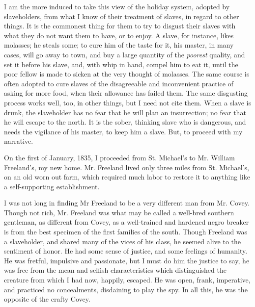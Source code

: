 I am the more induced to take this view of the holiday system, adopted
by slaveholders, from what I know of their treatment of slaves, in
regard to other things. It is the commonest thing for them to try to
disgust their slaves with what they do not want them to have, or to
enjoy. A slave, for instance, likes molasses; he steals some; to cure
him of the taste for it, his master, in many cases, will go away to
town, and buy a large quantity of the \emph{poorest} quality, and set it
before his slave, and, with whip in hand, compel him to eat it, until
the poor fellow is made to sicken at the very thought of molasses. The
same course is often adopted to cure slaves of the disagreeable and
inconvenient practice of asking for more food, when their allowance has
failed them. The same disgusting process works well, too, in other
things, but I need not cite them. When a slave is drunk, the slaveholder
has no fear that he will plan an insurrection; no fear that he will
escape to the north. It is the sober, thinking slave who is dangerous,
and needs the vigilance of his master, to keep him a slave. But, to
proceed with my narrative.

On the first of January, 1835, I proceeded from St. Michael's to Mr.
William Freeland's, my new home. Mr. Freeland lived only three miles
from St. Michael's, on an old worn out farm, which required much labor
{\protect\hypertarget{257}{}{}}to restore it to anything like a
self-supporting establishment.

I was not long in finding Mr Freeland to be a very different man from
Mr. Covey. Though not rich, Mr. Freeland was what may be called a
well-bred southern gentleman, as different from Covey, as a well-trained
and hardened negro breaker is from the best specimen of the first
families of the south. Though Freeland was a slaveholder, and shared
many of the vices of his class, he seemed alive to the sentiment of
honor. He had some sense of justice, and some feelings of humanity. He
was fretful, impulsive and passionate, but I must do him the justice to
say, he was free from the mean and selfish characteristics which
distinguished the creature from which I had now, happily, escaped. He
was open, frank, imperative, and practiced no concealments, disdaining
to play the spy. In all this, he was the opposite of the crafty Covey.


